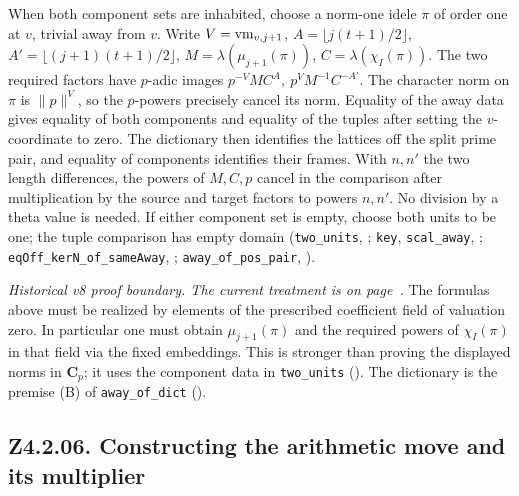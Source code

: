 When both component sets are inhabited, choose a norm-one idele \(\pi\) of order one at \(v\), trivial away from \(v\). Write \(V={\rm vm}_{v,j+1}\), \(A=\lfloor j(t+1)/2\rfloor\), \(A'=\lfloor(j+1)(t+1)/2\rfloor\), \(M=\lambda(\mu_{j+1}(\pi))\), \(C=\lambda(\chi_I(\pi))\). The two required factors have \(p\)-adic images
\(p^{-V}MC^A,\ p^V M^{-1}C^{-A'}\). The character norm on \(\pi\) is \(\lVert p\rVert^V\), so the \(p\)-powers precisely cancel its norm. Equality of the away data gives equality of both components and equality of the tuples after setting the \(v\)-coordinate to zero. The dictionary then identifies the lattices off the split prime pair, and equality of components identifies their frames. With \(n,n'\) the two length differences, the powers of \(M,C,p\) cancel in the comparison after multiplication by the source and target factors to powers \(n,n'\). No division by a theta value is needed. If either component set is empty, choose both units to be one; the tuple comparison has empty domain
(\nolinkurl{two_units}, ; \nolinkurl{key}, \nolinkurl{scal_away}, ; \nolinkurl{eqOff_kerN_of_sameAway}, ; \nolinkurl{away_of_pos_pair}, ).

\emph{Historical v8 proof boundary. The current treatment is on page~\pageref{r8:Z4.2.07}.} The formulas above must be realized by elements of the prescribed coefficient field of valuation zero. In particular one must obtain \(\mu_{j+1}(\pi)\) and the required powers of \(\chi_I(\pi)\) in that field via the fixed embeddings. This is stronger than proving the displayed norms in \(\mathbf C_p\); it uses the component data in \nolinkurl{two_units} (). The dictionary is the premise (B) of \nolinkurl{away_of_dict} ().

\subsection{Z4.2.06. Constructing the arithmetic move and its multiplier}\label{r8:Z4.2.06}

